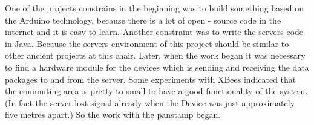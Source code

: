 One of the projects constrains in the beginning was to build something based on the Arduino technology, because there is a lot of open - source code in the internet and it is easy to learn.
Another constraint was to write the servers code in Java. Because the servers environment of this project should be similar to other ancient projects at this chair.
Later, when the work began it was necessary to find a hardware module for the devices which is sending and receiving the data packages to and from the server. Some experiments with XBees indicated that the commuting area is pretty to small to have a good functionality of the system. (In fact the server lost signal already when the Device was just approximately five metres apart.) So the work with the panstamp began.   
 

